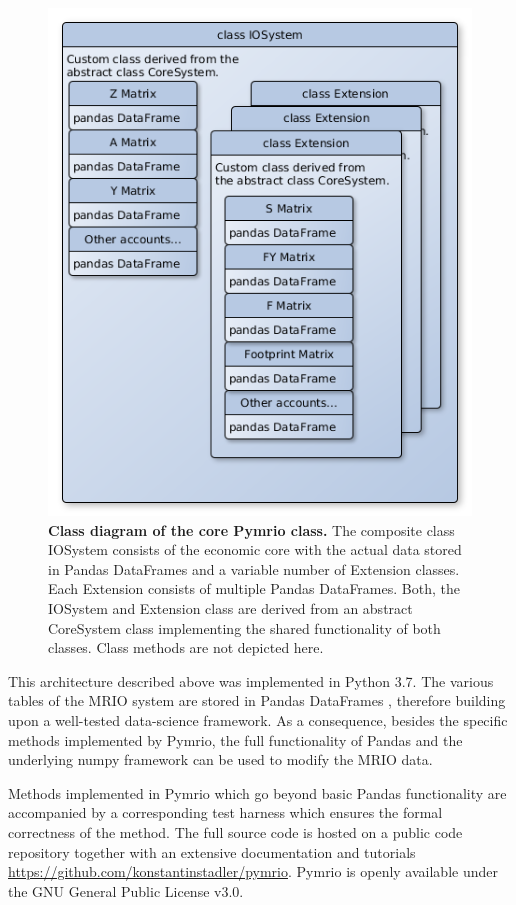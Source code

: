 \documentclass{jors}
\begin{document}
\begin{figure}[h!]
  \includegraphics[width=.9\textwidth]{./fig/IOSystem.png}
  \caption{\textbf{Class diagram of the core Pymrio class.}
  The composite class IOSystem consists of the economic core with the actual data stored in Pandas DataFrames and a variable number of Extension classes. Each Extension consists of multiple Pandas DataFrames. Both, the IOSystem and Extension class are derived from an abstract CoreSystem class implementing the shared functionality of both classes. Class methods are not depicted here.}
  \end{figure}

This architecture described above was implemented in Python 3.7.
The various tables of the MRIO system are stored in Pandas DataFrames \cite{mckinney2010_Data}, therefore building upon a well-tested data-science framework.
As a consequence, besides the specific methods implemented by Pymrio, the full functionality of Pandas and the underlying numpy framework \cite{vanderwalt2011_NumPy} can be used to modify the MRIO data.

Methods implemented in Pymrio which go beyond basic Pandas functionality are accompanied by a corresponding test harness which ensures the formal correctness of the method.
The full source code is hosted on a public code repository together with an extensive documentation and tutorials \url{https://github.com/konstantinstadler/pymrio}.  
Pymrio is openly available under the GNU General Public License v3.0.
\end{document}

